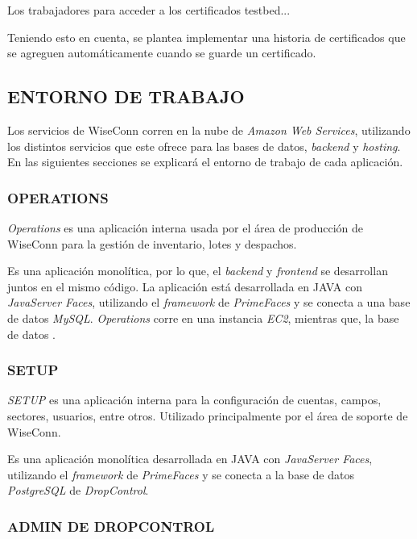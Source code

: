Los trabajadores para acceder a los certificados testbed...

Teniendo esto en cuenta, se plantea implementar una historia de certificados que se agreguen automáticamente cuando se guarde un
certificado.

\subsection{ENTORNO DE TRABAJO}

Los servicios de WiseConn corren en la nube de \textit{Amazon Web Services}, utilizando los distintos servicios que este ofrece para las bases de datos, \textit{backend} y \textit{hosting}. En las siguientes secciones se explicará el entorno de trabajo de cada aplicación.

\subsubsection{OPERATIONS}

\textit{Operations} es una aplicación interna usada por el área de producción de WiseConn para la gestión de inventario, lotes y despachos.

Es una aplicación monolítica, por lo que, el \textit{backend} y \textit{frontend} se desarrollan juntos en el mismo código. La aplicación está desarrollada en JAVA con \textit{JavaServer Faces}, utilizando el \textit{framework} de \textit{PrimeFaces} y se conecta a una base de datos \textit{MySQL}. \textit{Operations} corre en una instancia \textit{EC2}, mientras que, la base de datos .\

\subsubsection{SETUP}

\textit{SETUP} es una aplicación interna para la configuración de cuentas, campos, sectores, usuarios, entre otros. Utilizado principalmente por el área de soporte de WiseConn.

Es una aplicación monolítica desarrollada en JAVA con \textit{JavaServer Faces}, utilizando el \textit{framework} de \textit{PrimeFaces} y se conecta a la base de datos \textit{PostgreSQL} de \textit{DropControl}.

\subsubsection{ADMIN DE DROPCONTROL}

